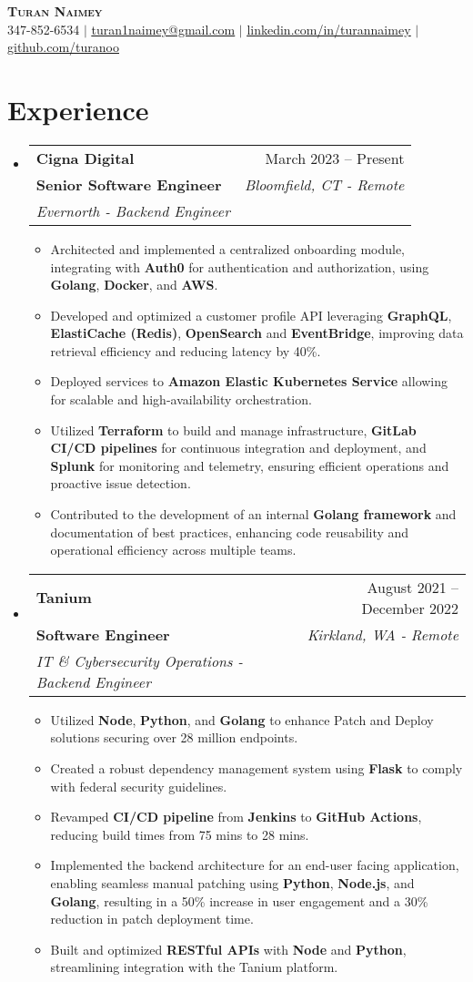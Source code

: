 \documentclass[letterpaper,11pt]{article}
\makeatletter
\newcommand{\resumeItem}[1]{
  \item\small{
    {#1 \vspace{-2pt}}
  }
}
\newcommand{\resumeSubheading}[5]{
  \vspace{-2pt}\item
    \begin{tabular*}{0.97\textwidth}[t]{l@{\extracolsep{\fill}}r}
      \textbf{#1} & #2 \\
      \textbf{\small#3} & \textit{\small #4} \\
      \textit{\small#5} \\
    \end{tabular*}\vspace{-7pt}
}
\newcommand{\resumeSubHeadingListStart}{\begin{itemize}[leftmargin=0.15in, label={}]}
\newcommand{\resumeSubHeadingListEnd}{\end{itemize}}
\newcommand{\resumeItemListStart}{\begin{itemize}}
\newcommand{\resumeItemListEnd}{\end{itemize}\vspace{-5pt}}
\makeatother
\begin{document}
\begin{center}
 \textbf{\Huge \scshape Turan Naimey} \\ \vspace{1pt}
 \small 347-852-6534 $|$ \href{mailto:turan1naimey@gmail.com}{\underline{turan1naimey@gmail.com}} $|$
 \href{https://linkedin.com/in/turannaimey}{\underline{linkedin.com/in/turannaimey}} $|$
 \href{https://github.com/turanoo}{\underline{github.com/turanoo}}
\end{center}

\section{Experience}

\resumeSubHeadingListStart
\resumeSubheading
{Cigna Digital}{March 2023 -- Present}
{Senior Software Engineer}{Bloomfield, CT - Remote}
{Evernorth - Backend Engineer}
\resumeItemListStart
\resumeItem{Architected and implemented a centralized onboarding module, integrating with \textbf{Auth0} for authentication and authorization, using \textbf{Golang}, \textbf{Docker}, and \textbf{AWS}.}
\resumeItem{Developed and optimized a customer profile API leveraging \textbf{GraphQL}, \textbf{ElastiCache (Redis)}, \textbf{OpenSearch} and \textbf{EventBridge}, improving data retrieval efficiency and reducing latency by 40\%. }
\resumeItem {Deployed services to \textbf{Amazon Elastic Kubernetes Service} allowing for scalable and high-availability orchestration.}
\resumeItem{Utilized \textbf{Terraform} to build and manage infrastructure, \textbf{GitLab CI/CD pipelines} for continuous integration and deployment, and \textbf{Splunk} for monitoring and telemetry, ensuring efficient operations and proactive issue detection.}
\resumeItem{Contributed to the development of an internal \textbf{Golang framework} and documentation of best practices, enhancing code reusability and operational efficiency across multiple teams.}
\resumeItemListEnd
\resumeSubHeadingListEnd


\resumeSubHeadingListStart
\resumeSubheading
{Tanium}{August 2021 -- December 2022}
{Software Engineer}{Kirkland, WA - Remote}
{IT \& Cybersecurity Operations - Backend Engineer}
\resumeItemListStart
\resumeItem{Utilized \textbf{Node}, \textbf{Python}, and \textbf{Golang} to enhance Patch and Deploy solutions securing over 28 million endpoints.}
\resumeItem{Created a robust dependency management system using \textbf{Flask} to comply with federal security guidelines.}
\resumeItem{Revamped \textbf{CI/CD pipeline} from \textbf{Jenkins} to \textbf{GitHub Actions}, reducing build times from 75 mins to 28 mins.}
\resumeItem{Implemented the backend architecture for an end-user facing application, enabling seamless manual patching using \textbf{Python}, \textbf{Node.js}, and \textbf{Golang}, resulting in a 50\% increase in user engagement and a 30\% reduction in patch deployment time.}
\resumeItem{Built and optimized \textbf{RESTful APIs} with \textbf{Node} and \textbf{Python}, streamlining integration with the Tanium platform.}
\resumeItemListEnd
\resumeSubHeadingListEnd
\end{document}
